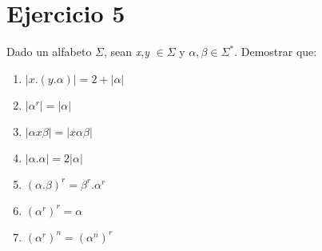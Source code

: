\documentclass[12pt]{article}
\begin{document}
\section*{Ejercicio 5}
Dado un alfabeto $\Sigma$, sean \textit{x},\textit{y} $\in \Sigma$ y $\alpha,\beta \in \Sigma^*$. Demostrar que:
\begin{enumerate}[label=\Roman*.]
    \item $|x.(y.\alpha)| = 2 + |\alpha|$
    \item $|\alpha^r|=|\alpha|$
    \item $|\alpha x \beta| = |x \alpha \beta|$
    \item $|\alpha . \alpha| = 2 |\alpha|$
    \item $(\alpha . \beta)^r = \beta^r . \alpha^r$
    \item $(\alpha^r)^r = \alpha$
    \item $(\alpha^r)^n = (\alpha^n)^r$
\end{enumerate}
\end{document}
